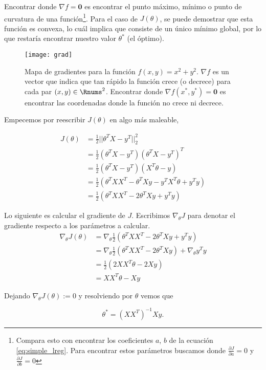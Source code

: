 \documentclass[11pt]{article}
\begin{document}
Encontrar donde $\nabla f = \bm{0}$ es encontrar el punto máximo,  mínimo o punto de curvatura de una función\footnote{Compara esto con encontrar los coeficientes $a$, $b$ de la ecuación \ref{eq:simple_lreg}. Para encontrar estos parámetros buscamos donde $\frac{\partial J}{\partial a} = 0$ y $\frac{\partial J}{\partial b} = 0$}. Para el caso de $J(\theta)$, se puede demostrar que esta función es convexa, lo cuál implica que consiste de un único mínimo global, por lo que restaría encontrar nuestro valor $\theta^*$ (el óptimo).

\begin{figure}
	\centering
	\texttt{[image: grad]}
	\caption{Mapa de gradientes para la función $f(x, y) = x^2 + y^2$. $\nabla f$ es un vector que indica que tan rápido la función crece (o decrece) para cada par $(x,y) \in\Rnums^2$. Encontrar donde $\nabla f(x^*, y^*) = \bm{0}$ es encontrar las coordenadas donde la función no crece ni decrece.}
\end{figure}

Empecemos por reescribir $J(\theta)$ en algo más maleable,

 \begin{align}
   J(\theta) &= \frac{1}{2}||\theta^TX - y^T||_2^2\\
             &= \frac{1}{2}(\theta^TX - y^T)(\theta^TX - y^T)^T \\
             &= \frac{1}{2}(\theta^TX - y^T)(X^T\theta - y)\\
             &= \frac{1}{2}(\theta^TXX^T - \theta^T Xy - y^TX^T\theta + y^Ty)\\
             &= \frac{1}{2}(\theta^TXX^T - 2\theta^T Xy + y^Ty)
\end{align}

Lo siguiente es calcular el gradiente de $J$. Escribimos $\nabla_\theta J$ para denotar el gradiente respecto a los parámetros a calcular.
\begin{align}
    \nabla_\theta J(\theta) &= \nabla_\theta \frac{1}{2}(\theta^TXX^T - 2\theta^T Xy + y^Ty) \\
    &= \nabla_\theta \frac{1}{2}(\theta^TXX^T - 2\theta^T Xy) + \nabla_\theta y^Ty \\
    &= \frac{1}{2} (2 XX^T\theta -  2 Xy)\\
    &= XX^T\theta - Xy
\end{align}

Dejando $\nabla_\theta J(\theta) := 0$ y resolviendo por $\theta$ vemos que 

\begin{equation}\label{eq:normeq}
  \theta^* = (XX^T)^{-1}Xy.
\end{equation}
\end{document}
